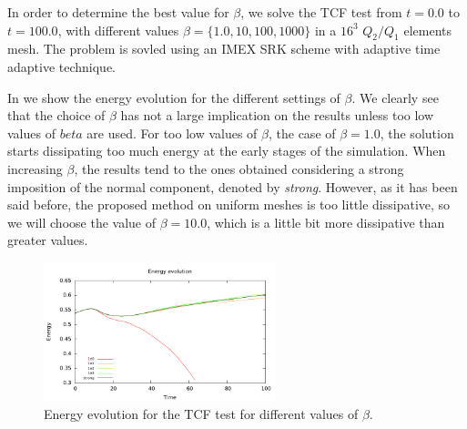 In order to determine the best value for $ \beta $, we solve the TCF test from $ t=0.0 $ to $ t=100.0 $, with different values $ \beta=\{1.0,10,100,1000\} $ in a $ 16^3 $ $ Q_2/Q_1 $ elements mesh. The problem is sovled using an IMEX SRK scheme with adaptive time adaptive technique.

In  we show the energy evolution for the different settings of $ \beta $. We clearly see that the choice of $ \beta $ has not a large implication on the results unless too low values of $ beta $ are used. For too low values of $ \beta $, the case of $ \beta=1.0 $, the solution starts dissipating too much energy at the early stages of the simulation. When increasing $ \beta $, the results tend to the ones obtained considering a strong imposition of the normal component, denoted by \textit{strong}. However, as it has been said before, the proposed method on uniform meshes is too little dissipative, so we will choose the value of $ \beta=10.0 $, which is a little bit more dissipative than greater values.
\begin{figure}[h!]
  \centering
  \includegraphics[width=0.6\textwidth]{Figures/Chapter7/TCF/ene_beta}
  \caption{Energy evolution for the TCF test for different values of $ \beta $.}
  \label{fig-TCF_ene_beta}
\end{figure}
%
%
%
